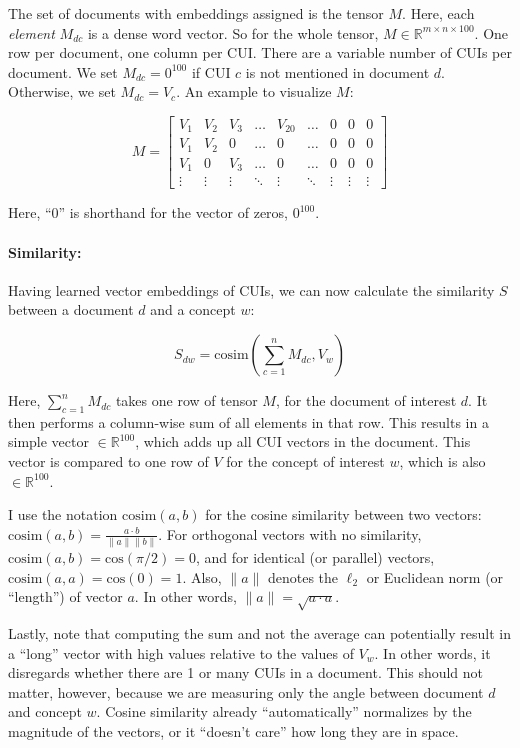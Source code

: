 \documentclass{article}
\begin{document}
The set of documents with embeddings assigned is the tensor $M$. Here,
each \emph{element} $M_{dc}$ is a dense word vector. So for the whole
tensor, $M \in \mathbb{R}^{m \times n \times 100}$. One row per
document, one column per CUI. There are a variable number of CUIs per
document. We set $M_{dc} = 0^{100}$ if CUI $c$ is not mentioned in
document $d$. Otherwise, we set $M_{dc} = V_c$. An example to
visualize $M$:

\begin{equation}
  M = \left[
      \begin{array}{ccccccccc}
        V_1 & V_2 & V_3 & \ldots & V_{20} & \ldots & 0 & 0 & 0 \\
        V_1 & V_2 & 0   & \ldots & 0      & \ldots & 0 & 0 & 0 \\
        V_1 & 0   & V_3 & \ldots & 0      & \ldots & 0 & 0 & 0 \\
        \vdots & \vdots & \vdots & \ddots & \vdots & \ddots & \vdots & \vdots & \vdots
      \end{array} \right]
\end{equation}

Here, ``0'' is shorthand for the vector of zeros, $0^{100}$.

\paragraph{Similarity:} Having learned vector embeddings of CUIs, we
can now calculate the similarity $S$ between a document $d$ and a
concept $w$:

\begin{equation}
  S_{dw} = \mathrm{cosim}(\sum_{c=1}^n M_{dc}, V_w)
\end{equation}

Here, $\sum_{c=1}^n M_{dc}$ takes one row of tensor $M$, for the
document of interest $d$. It then performs a column-wise sum of all
elements in that row. This results in a simple vector
$\in \mathbb{R}^{100}$, which adds up all CUI vectors in the document.
This vector is compared to one row of $V$ for the concept of interest $w$,
which is also $\in \mathbb{R}^{100}$.

I use the notation $\mathrm{cosim}(a, b)$ for the cosine similarity between two
vectors: $\mathrm{cosim}(a,b) = \frac{a \cdot b}{\|a\| \|b\|}$. For
orthogonal vectors with no similarity, $\mathrm{cosim}(a,b) =
\mathrm{cos}(\pi / 2) = 0$, and for identical (or parallel) vectors,
$\mathrm{cosim}(a,a) = \mathrm{cos}(0) = 1$. Also, $ \| a \| $ denotes
the $\ell_2$ or Euclidean norm (or ``length'') of vector $a$. In other
words, $ \| a \| = \sqrt{a \cdot a}$.

Lastly, note that computing the sum and not the average can
potentially result in a ``long'' vector with high values relative to
the values of $V_w$. In other words, it disregards whether there are 1
or many CUIs in a document. This should not matter, however, because
we are measuring only the angle between document $d$ and concept $w$.
Cosine similarity already ``automatically'' normalizes by the
magnitude of the vectors, or it ``doesn't care'' how long they are in space.
\end{document}
